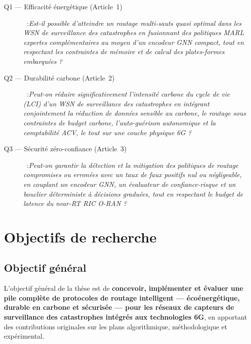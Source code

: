 \begin{description}
  \item[Q1 — Efficacité énergétique (Article~1)]~:\emph{Est-il possible d'atteindre un routage multi-sauts quasi optimal dans les WSN de surveillance des catastrophes en fusionnant des politiques MARL expertes complémentaires au moyen d'un encodeur GNN compact, tout en respectant les contraintes de mémoire et de calcul des plates-formes embarquées ?}\cite{rashid2018qmix,son2019qtran,liu2024gnncomm,tinyml_review_acm2024}

  \item[Q2 — Durabilité carbone (Article~2)]~:\emph{Peut-on réduire significativement l'intensité carbone du cycle de vie (LCI) d'un WSN de surveillance des catastrophes en intégrant conjointement la réduction de données sensible au carbone, le routage sous contraintes de budget carbone, l'auto-guérison autonomique et la comptabilité ACV, le tout sur une couche physique 6G ?}\cite{pirson2021embodied,freitag2021ict,aioti2024carbon,itu_ict2025}

  \item[Q3 — Sécurité zéro-confiance (Article~3)]~:\emph{Peut-on garantir la détection et la mitigation des politiques de routage compromises ou erronées avec un taux de faux positifs nul ou négligeable, en couplant un encodeur GNN, un évaluateur de confiance-risque et un bouclier déterministe à décisions graduées, tout en respectant le budget de latence du near-RT RIC O-RAN ?}\cite{rose2020nist,polese2023oran,pranger2025shields,ztaiot_acm2025}
\end{description}

\section{Objectifs de recherche}\label{sec:Objectifs}

\subsection{Objectif général}

L'objectif général de la thèse est de \textbf{concevoir, implémenter et évaluer une pile complète de protocoles de routage intelligent — écoénergétique, durable en carbone et sécurisée — pour les réseaux de capteurs de surveillance des catastrophes intégrés aux technologies 6G}, en apportant des contributions originales sur les plans algorithmique, méthodologique et expérimental\cite{freitag2021ict,saad2020vision6g,polese2023oran}.

